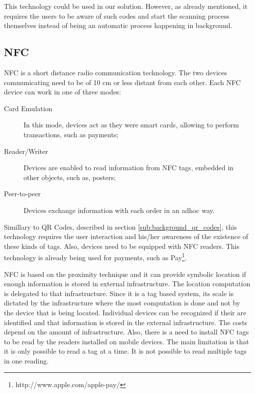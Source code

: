This technology could be used in our solution.
However, as already mentioned, it requires the users to be aware of such codes and start the scanning process themselves instead of being an automatic process happening in background.

\subsection{NFC}
\label{sub:background_near_field _communication}
\gls{NFC} is a short distance radio communication technology.
The two devices communicating need to be of 10 cm or less distant from each other.
Each \gls{NFC} device can work in one of three modes:
\begin{description}
  \item[Card Emulation] In this mode, devices act as they were smart cards, allowing to perform transactions, such as payments;
  \item[Reader/Writer] Devices are enabled to read information from \gls{NFC} tags, embedded in other objects, such as, posters;
  \item[Peer-to-peer] Devices exchange information with each order in an adhoc way.
\end{description}

Simillary to \gls{QR} Codes, described in section \ref{sub:background_qr_codes}, this technology requires the user interaction and his/her awareness of the existence of these kinds of tags.
Also, devices need to be equipped with \gls{NFC} readers.
This technology is already being used for payments, such as  Pay\footnote{http://www.apple.com/apple-pay/}.

\gls{NFC} is based on the proximity technique and it can provide symbolic location if enough information is stored in external infrastructure.
The location computation is delegated to that infrastructure.
Since it is a tag based system, its scale is dictated by the infrastructure where the most computation is done and not by the device that is being located.
Individual devices can be recognized if their are identified and that information is stored in the external infrastructure.
The costs depend on the amount of infrastructure. Also, there is a need to install \gls{NFC} tags to be read by the readers installed on mobile devices.
The main limitation is that it is only possible to read a tag at a time. It is not possible to read multiple tags in one reading.

